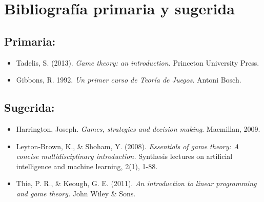 \documentclass[11pt]{article}
\begin{document}
\section{Bibliografía primaria y sugerida}

\subsection{Primaria:}

\begin{itemize}
	\item Tadelis, S. (2013). \textit{Game theory: an introduction.} Princeton University Press.
	\item Gibbons, R. 1992. \textit{Un primer curso de Teoría de Juegos}. Antoni Bosch.
\end{itemize}

\subsection{Sugerida:}

\begin{itemize}
	\item Harrington, Joseph.\textit{ Games, strategies and decision making}. Macmillan, 2009.
	\item Leyton-Brown, K., \& Shoham, Y. (2008). \textit{Essentials of game theory: A concise multidisciplinary introduction.} Synthesis lectures on artificial intelligence and machine learning, 2(1), 1-88.
	\item Thie, P. R., \& Keough, G. E. (2011). \textit{An introduction to linear programming and game theory.} John Wiley \& Sons.
	
\end{itemize}
\end{document}
